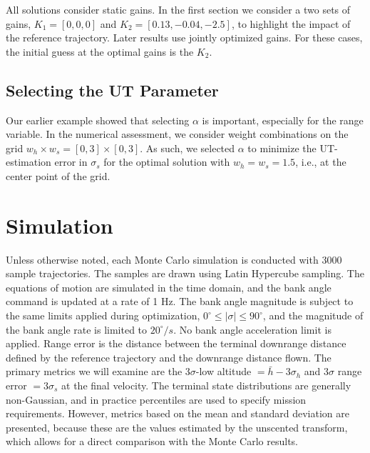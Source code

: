 All solutions consider static gains. In the first section we consider a two sets of gains, $K_1=[0,0,0]$ and $K_2 = [0.13,-0.04,-2.5]$, to highlight the impact of the reference trajectory. Later results use jointly optimized gains. For these cases, the initial guess at the optimal gains is the $K_2$.

\subsection{Selecting the UT Parameter}

Our earlier example showed that selecting $\alpha$ is important, especially for the range variable. In the numerical assessment, we consider weight combinations on the grid $w_h\times w_s = [0,3]\times[0,3]$. As such, we selected $\alpha$ to minimize the UT-estimation error in $\sigma_s$ for the optimal solution with $w_h=w_s=1.5$, i.e., at the center point of the grid. 

\section{Simulation}
Unless otherwise noted, each Monte Carlo simulation is conducted with 3000 sample trajectories. The samples are drawn using Latin Hypercube sampling. The equations of motion are simulated in the time domain, and the bank angle command is updated at a rate of 1 Hz. The bank angle magnitude is subject to the same limits applied during optimization, $0^{\circ}\le|\sigma|\le90^{\circ}$, and the magnitude of the bank angle rate is limited to $20^{\circ}/s$. No bank angle acceleration limit is applied. Range error is the distance between the terminal downrange distance defined by the reference trajectory and the downrange distance flown. The primary metrics we will examine are the 3$\sigma$-low altitude $=\bar{h}-3\sigma_h$ and 3$\sigma$ range error $= 3\sigma_s$ at the final velocity. The terminal state distributions are generally non-Gaussian, and in practice percentiles are used to specify mission requirements. However, metrics based on the mean and standard deviation are presented, because these are the values estimated by the unscented transform, which allows for a direct comparison with the Monte Carlo results.


